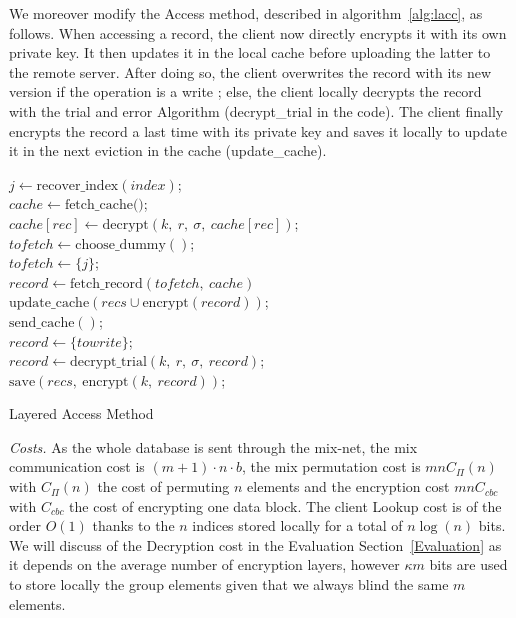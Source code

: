 \documentclass[USenglish,oneside,twocolumn]{article}
\begin{document}
We moreover modify the Access method, described in algorithm~\ref{alg:lacc}, as follows. When accessing a record, the client now directly encrypts it with its own private key. It then updates it in the local cache before uploading the latter to the remote server.
After doing so, the client overwrites the record with its new version if the operation is a write ; else, the client locally decrypts the record with the trial and error Algorithm (decrypt\_trial in the code). The client finally encrypts the record a last time with its private key and saves it locally to update it in the next eviction in the cache (update\_cache). \\

\begin{algorithm}
\DontPrintSemicolon
{}
$j \gets \text{recover\_index}(index)$;\\
$cache \gets \text{fetch\_cache()}$;\\
{
$cache[rec]\gets \text{decrypt}(k,\ r,\ \sigma,\ cache[rec])$;\\
}
{
$tofetch \gets \text{choose\_dummy}()$;\\
}
\Else
{
$tofetch \gets \{j\}$;\\
}
$record \gets \text{fetch\_record}(tofetch,\ cache)$\\
$\text{update\_cache}(recs \cup \text{encrypt}(record))$;\\
$\text{send\_cache}()$;\\

{
$record \gets \{towrite\}$;\\
}
\Else
{
$record \gets \text{decrypt\_trial}(k,\ r,\ \sigma,\ record)$;\\
}
$\text{save}(recs,\ \text{encrypt}(k,\ record))$;\\
\caption{Layered Access Method}
\label{alg:lacc}
\end{algorithm}

\noindent\textit{Costs.}
As the whole database is sent through the mix-net, the mix communication cost is $ (m+1) \cdot n \cdot b$, the mix permutation cost is $mn C_{\Pi}(n)$ with $C_{\Pi}(n)$ the cost of permuting $n$ elements and the encryption cost $m n C_{cbc}$ with $C_{cbc}$ the cost of encrypting one data block. The client Lookup cost is of the order $O(1)$ thanks to the $n$ indices stored locally for a total of $n\log(n)$ bits. We will discuss of the Decryption cost in the Evaluation Section~\ref{Evaluation} as it depends on the average number of encryption layers, however $\kappa m$ bits are used to store locally the group elements given that we always blind the same $m$ elements.\\
\end{document}
